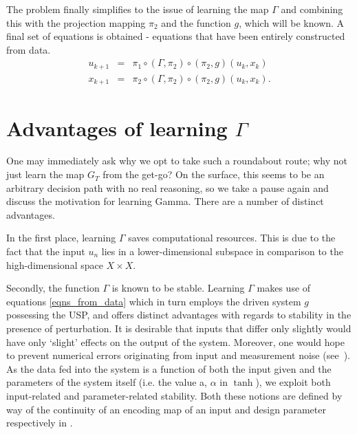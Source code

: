 \documentclass[a4paper,12pt,twoside]{report}
\begin{document}
The problem finally simplifies to the issue of learning the map $\Gamma$ and combining this with the projection mapping $\pi_2$ and the function $g$, which will be known. A final set of equations is obtained - equations that have been entirely constructed from data.
\begin{eqnarray}\label{eqns_from_data}
	u_{k+1} &=& \pi_1 \circ (\Gamma, \pi_2) \circ (\pi_2,g) (u_k,x_k) \label{Seqn_u}\\
	x_{k+1} &=& \pi_2 \circ (\Gamma, \pi_2) \circ (\pi_2,g) (u_k,x_k). \label{Seqn_x}
\end{eqnarray}



\section{Advantages of learning $\Gamma$} \label{subs_LearnGamma}

One may immediately ask why we opt to take such a roundabout route; why not just learn the map $G_T$ from the get-go? On the surface, this seems to be an arbitrary decision path with no real reasoning, so we take a pause again and discuss the motivation for learning Gamma.
There are a number of distinct advantages. 

In the first place, learning $\Gamma$ saves computational resources. This is due to the fact that the input $u_n$ lies in a lower-dimensional subspace in comparison to the high-dimensional space $X\times{X}$. 


Secondly, the function $\Gamma$ is known to be stable. Learning $\Gamma$ makes use of equations \ref{eqns_from_data} which in turn employs the driven system $g$ possessing the USP, and offers distinct advantages with regards to stability in the presence of perturbation. It is desirable that inputs that differ only slightly would have only ‘slight’ effects on the output of the system. Moreover, one would hope to prevent numerical errors originating from input and measurement noise (see~\cite[Th. 5]{manjunath2021universal}). 
As the data fed into the system is a function of both the input given and the parameters of the system itself (i.e. the value a, $\alpha$ in $\tanh$), we exploit both input-related and parameter-related stability. Both these notions are defined by way of the continuity of an encoding map of an input and design parameter respectively in \cite{manjunath2020stability}.
\end{document}
